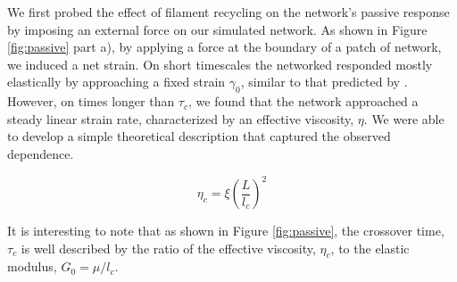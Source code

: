\documentclass[10pt,letterpaper]{article}
\begin{document}
We first probed the effect of filament recycling on the network's passive response by imposing an external force on our simulated network.   As shown in Figure \ref{fig:passive} part a), by applying a force at the boundary of a patch of network, we induced a net strain.  On short timescales the networked responded mostly elastically by approaching a fixed strain $\gamma_0$, similar to that predicted by \cite{theo_hlm}.  However, on times longer than $\tau_c$, we found that the network approached a steady linear strain rate, characterized by an effective viscosity, $\eta$.  We were able to develop a simple theoretical description that captured the observed dependence.

\begin{equation}
\label{eqn:eff_vic}
\eta_c = \xi\left (\frac{L}{l_c}\right )^2
\end{equation}

It is interesting to note that as shown in Figure \ref{fig:passive}, the crossover time, $\tau_c$ is well described by the ratio of the effective viscosity, $\eta_c$, to the elastic modulus, $G_0 = \mu/l_c$.
\end{document}
